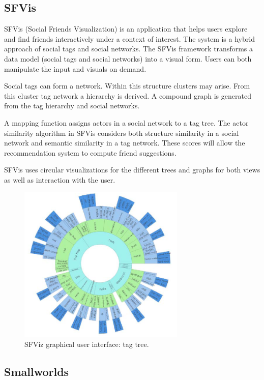 \subsection{SFVis}\label{chapter:survey:section:applications:subsection:sfvis}

SFVis (Social Friends Visualization) is an application that helps users explore and find friends interactively under a context of interest. The system is a hybrid approach of social tags and social networks. The SFVis framework transforms a data model (social tags and social networks) into a visual form. Users can both manipulate the input and visuals on demand.

Social tags can form a network. Within this structure clusters may arise. From this cluster tag network a hierarchy is derived. A compound graph is generated from the tag hierarchy and social networks.

A mapping function assigns actors in a social network to a tag tree. The actor similarity algorithm in SFVis considers both structure similarity in a social network and semantic similarity in a tag network. These scores will allow the recommendation system to compute friend suggestions.

SFVis uses circular visualizations for the different trees and graphs for both views as well as interaction with the user.

\begin{figure}%
	\begin{center}
		\includegraphics[width=300px]{img/sfviz_tagtree}%
	\end{center}
	\caption{SFViz graphical user interface: tag tree.}%
	\label{figure:sfviz}%
\end{figure}



\subsection{Smallworlds}\label{chapter:survey:section:applications:subsection:smallwords}

